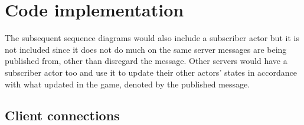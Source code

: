 \documentclass[]{final}
\begin{document}
\newpage

\section{Code implementation}

The subsequent sequence diagrams would also include a subscriber actor
but it is not included since it does not do much on the same server
messages are being published from, other than disregard the message.
Other servers would have a subscriber actor too and use it to update
their other actors' states in accordance with what updated in the game,
denoted by the published message.

\subsection{Client connections}
\end{document}
